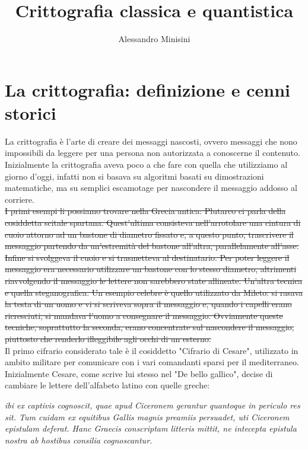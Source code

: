\documentclass[italian,A4,12pt]{article}
\title{Crittografia classica e quantistica}
\author{Alessandro Minisini}
\affil{Liceo Scientifico Niccolò Copernico}
\date{}
\begin{document}
  \maketitle
  \section{La crittografia: definizione e cenni storici}
    La crittografia è l'arte di creare dei messaggi nascosti, ovvero messaggi che nono impossibili da leggere per una persona non autorizzata a conoscerne il contenuto.\\
    Inizialmente la crittografia aveva poco a che fare con quella che utilizziamo al giorno d'oggi, infatti non si basava su algoritmi basati su dimostrazioni matematiche, ma su semplici escamotage per nascondere il messaggio addosso al corriere.\\
    \sout{
    I primi esempi li possiamo trovare nella Grecia antica: Plutarco ci parla della cosiddetta scitale spartana. Quest'ultima consisteva nell'arrotolare una cintura di cuoio attorno ad un bastone di diametro fissato e, a questo punto, trascrivere il messaggio partendo da un'estremità del bastone all'altra, parallelamente all'asse. Infine si svolggeva il cuoio e si trasmetteva al destinatario. Per poter leggere il messaggio era necessario utilizzare un bastone con lo stesso diametro, altrimenti riavvolgendo il messaggio le lettere non sarebbero state allineate. Un'altra tecnica e quella steganografica. Un esempio celebre è quello utilizzato da Mileto: si rasava la testa di un uomo e vi si scriveva sopra il messaggio e, quando i capelli erano ricresciuti, si mandava l'uomo a consegnare il messaggio.
    Ovviamente queste tecniche, soprattutto la seconda, erano concentrate sul nascondere il messaggio, piuttosto che renderlo illeggibile agli occhi di un esterno.}\\
    Il primo cifrario considerato tale è il cosiddetto "Cifrario di Cesare", utilizzato in ambito militare per comunicare con i vari comandanti sparsi per il mediterraneo.
    Inizialmente Cesare, come scrive lui stesso nel "De bello gallico", decise di cambiare le lettere dell'alfabeto latino con quelle greche:
    \newpage
    \begin{displayquote}
      \textit{ibi ex captivis cognoscit, quae apud Ciceronem gerantur quantoque in periculo res sit.
      Tum cuidam ex equitibus Gallis magnis preamiis persuadet, uti Ciceronem epistulam deferat.
      Hanc Graecis conscriptam litteris mittit, ne intecepta epistula nostra ab hostibus consilia cognoscantur.}
    \end{displayquote}
\end{document}

